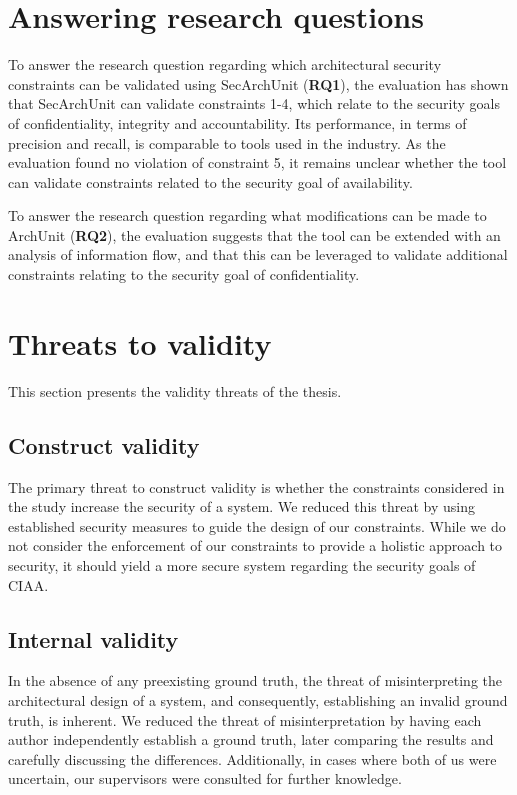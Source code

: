 \section{Answering research questions}
To answer the research question regarding which architectural security constraints can be validated using SecArchUnit (\textbf{RQ1}), the evaluation has shown that SecArchUnit can validate constraints 1-4, which relate to the security goals of confidentiality, integrity and accountability. Its performance, in terms of precision and recall, is comparable to tools used in the industry. As the evaluation found no violation of constraint 5, it remains unclear whether the tool can validate constraints related to the security goal of availability.

To answer the research question regarding what modifications can be made to ArchUnit (\textbf{RQ2}), the evaluation suggests that the tool can be extended with an analysis of information flow, and that this can be leveraged to validate additional constraints relating to the security goal of confidentiality.



\section{Threats to validity}
This section presents the validity threats of the thesis. 

\subsection{Construct validity}
The primary threat to construct validity is whether the constraints considered in the study increase the security of a system. We reduced this threat by using established security measures to guide the design of our constraints. While we do not consider the enforcement of our constraints to provide a holistic approach to security, it should yield a more secure system regarding the security goals of CIAA.


\subsection{Internal validity}
In the absence of any preexisting ground truth, the threat of misinterpreting the architectural design of a system, and consequently, establishing an invalid ground truth, is inherent. We reduced the threat of misinterpretation by having each author independently establish a ground truth, later comparing the results and carefully discussing the differences. Additionally, in cases where both of us were uncertain, our supervisors were consulted for further knowledge.


